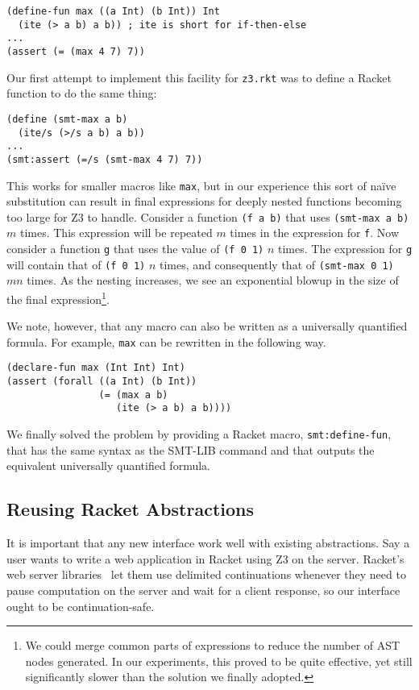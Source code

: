 \begin{verbatim}
(define-fun max ((a Int) (b Int)) Int
  (ite (> a b) a b)) ; ite is short for if-then-else
...
(assert (= (max 4 7) 7))
\end{verbatim}

Our first attempt to implement this facility for \texttt{z3.rkt} was to define
a Racket function to do the same thing:

\begin{verbatim}
(define (smt-max a b)
  (ite/s (>/s a b) a b))
...
(smt:assert (=/s (smt-max 4 7) 7))
\end{verbatim}

This works for smaller macros like \texttt{max}, but in our experience this
sort of na\"{i}ve substitution can result in final expressions for deeply
nested functions becoming too large for Z3 to handle. Consider a function
\texttt{(f a b)} that uses \texttt{(smt-max a b)} $m$ times. This expression
will be repeated $m$ times in the expression for \texttt{f}. Now consider a
function \texttt{g} that uses the value of \texttt{(f 0 1)} $n$ times. The
expression for \texttt{g} will contain that of \texttt{(f 0 1)} $n$ times, and
consequently that of \texttt{(smt-max 0 1)} $m n$ times. As the nesting
increases, we see an exponential blowup in the size of the final
expression\footnote{We could merge common parts of expressions to reduce the
number of AST nodes generated. In our experiments, this proved to be quite
effective, yet still significantly slower than the solution we finally
adopted.}.

We note, however, that any macro can also be written as a universally
quantified formula. For example, \texttt{max} can be rewritten in the
following way.

\begin{verbatim}
(declare-fun max (Int Int) Int)
(assert (forall ((a Int) (b Int))
                (= (max a b)
                   (ite (> a b) a b))))
\end{verbatim}

We finally solved the problem by providing a Racket macro,
\texttt{smt:define-fun}, that has the same syntax as the SMT-LIB command
and that outputs the equivalent universally quantified formula.

\subsection{Reusing Racket Abstractions}

It is important that any new interface work well with existing abstractions.
Say a user wants to write a web application in Racket using Z3 on the server.
Racket's web server libraries~\cite{racket/web-server} let them use delimited
continuations whenever they need to pause computation on the server and wait
for a client response, so our interface ought to be continuation-safe.


